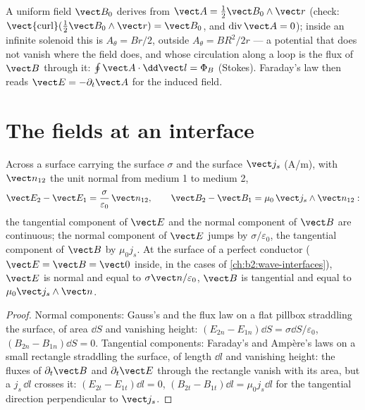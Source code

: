\begin{example}\label{ex:b2:maxwell-equations:vectorpot}
A uniform field $\vect B_0$ derives from $\vect A = \tfrac12\vect B_0\wedge\vect r$
(check: $\operatorname{\vect{curl}}(\tfrac12\vect B_0\wedge\vect r) = \vect B_0$, and
$\operatorname{div}\vect A = 0$); inside an infinite solenoid this is $A_\theta =
Br/2$, outside $A_\theta = BR^2/2r$ --- a potential that does not vanish
where the field does, and whose circulation along a loop is the flux
of $\vect B$ through it: $\oint\vect A\cdot\dd\vect l = \Phi_B$ (Stokes). Faraday's
law then reads $\vect E = -\partial_t\vect A$ for the induced field.
\end{example}

\section{The fields at an interface}

\begin{proposition}\label{prop:b2:maxwell-equations:boundary}
Across a surface carrying the surface  $\sigma$ and the
surface  $\vect j_s$ (\unit{A/m}), with $\vect n_{12}$ the unit
normal from medium 1 to medium 2,
\[
\vect E_2 - \vect E_1 = \frac\sigma{\varepsilon_0}\,\vect n_{12} , \qquad
\vect B_2 - \vect B_1 = \mu_0\,\vect j_s\wedge\vect n_{12} :
\]
the tangential component of $\vect E$ and the normal component of $\vect B$
are continuous; the normal component of $\vect E$ jumps by $\sigma/\varepsilon_0$,
the tangential component of $\vect B$ by $\mu_0j_s$. At the surface of a
perfect conductor ($\vect E = \vect B = \vect 0$ inside, in the cases of
\cref{ch:b2:wave-interfaces}), $\vect E$ is normal and equal to $\sigma\vect n/
\varepsilon_0$, $\vect B$ is tangential and equal to $\mu_0\vect j_s\wedge\vect n$.
\end{proposition}

\begin{proof}
Normal components: Gauss's and the flux law on a flat pillbox
straddling the surface, of area $\dd S$ and vanishing height: $(E_{2n}
- E_{1n})\dd S = \sigma\dd S/\varepsilon_0$, $(B_{2n} - B_{1n})\dd S = 0$. Tangential
components: Faraday's and Ampère's laws on a small rectangle
straddling the surface, of length $\dd l$ and vanishing height: the
fluxes of $\partial_t\vect B$ and $\partial_t\vect E$ through the rectangle vanish
with its area, but a  $j_s\,\dd l$ crosses it:
$(E_{2t} - E_{1t})\dd l = 0$, $(B_{2t} - B_{1t})\dd l = \mu_0j_s\dd l$ for the
tangential direction perpendicular to $\vect j_s$.
\end{proof}

